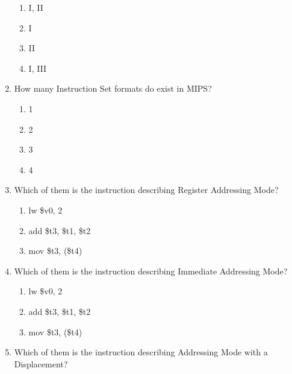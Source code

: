 \documentclass[paper=8.2in:11.6in]{scrartcl}
\begin{document}
\begin{enumerate}
\begin{enumerate}[label=\Roman*.]
\end{enumerate}

\begin{enumerate}[label=\alph*)]

\item I, II
\item I
\item II
\item I, III

\end{enumerate}

\item How many Instruction Set formats do exist in MIPS?

\begin{enumerate}[label=\alph*)]

\item 1
\item 2
\item 3
\item 4

\end{enumerate}

\item Which of them is the instruction describing Register Addressing Mode?

\begin{enumerate}[label=\alph*)]

\item lw \$v0, 2
\item add \$t3, \$t1, \$t2
\item mov \$t3, (\$t4)

\end{enumerate}

\item Which of them is the instruction describing Immediate Addressing Mode?

\begin{enumerate}[label=\alph*)]

\item lw \$v0, 2
\item add \$t3, \$t1, \$t2
\item mov \$t3, (\$t4)

\end{enumerate}

\item Which of them is the instruction describing Addressing Mode with a Displacement?

\begin{enumerate}[label=\alph*)]


\end{enumerate}
\end{enumerate}
\end{document}
